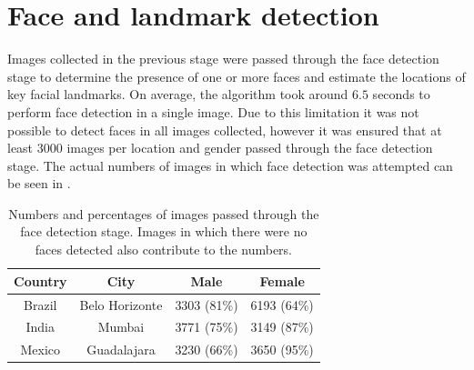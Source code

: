 \section{Face and landmark detection}
\label{results:fd}
Images collected in the previous stage were passed through the face detection
stage to determine the presence of one or more faces and estimate the locations
of key facial landmarks. On average, the algorithm took around $6.5$ seconds to
perform face detection in a single image. Due to this limitation it was not
possible to detect faces in all images collected, however it was ensured that
at least 3000 images per location and gender passed through the face detection
stage. The actual numbers of images in which face detection was attempted can
be seen in .
\begin{table}[t]
    \begin{center}
        \begin{tabular}{ c c c c}
            \toprule
            Country       & City              & Male   & Female\\ 
            \toprule
            Brazil  & Belo Horizonte &  3303 (81\%) & 6193 (64\%)\\
            India   & Mumbai         &  3771 (75\%) & 3149 (87\%)\\
            Mexico  & Guadalajara    &  3230 (66\%) & 3650 (95\%)\\
            \bottomrule
        \end{tabular}
    \end{center}
    \caption{Numbers and percentages of images passed through the face
    detection stage. Images in which there were no faces detected also
contribute to the numbers.}
    \label{table:results:fd:detected}
\end{table}

